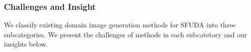 \documentclass[10pt,journal,compsoc]{IEEEtran}
\def\ie{{\em i.e.}}
\begin{document}
\subsubsection{Challenges and Insight}
We classify existing domain image generation methods for SFUDA into three subcategories. %
We present the challenges of methods in each subcatetory and our insights below. 
\end{document}

